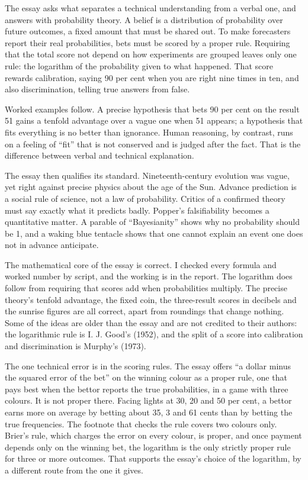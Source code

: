 \begin{afterword}
\summaryhead

The essay asks what separates a technical understanding from a verbal one, and answers with probability theory. A belief is a distribution of probability over future outcomes, a fixed amount that must be shared out. To make forecasters report their real probabilities, bets must be scored by a proper rule. Requiring that the total score not depend on how experiments are grouped leaves only one rule: the logarithm of the probability given to what happened. That score rewards calibration, saying 90 per cent when you are right nine times in ten, and also discrimination, telling true answers from false.

Worked examples follow. A precise hypothesis that bets 90 per cent on the result 51 gains a tenfold advantage over a vague one when 51 appears; a hypothesis that fits everything is no better than ignorance. Human reasoning, by contrast, runs on a feeling of ``fit'' that is not conserved and is judged after the fact. That is the difference between verbal and technical explanation.

The essay then qualifies its standard. Nineteenth-century evolution was vague, yet right against precise physics about the age of the Sun. Advance prediction is a social rule of science, not a law of probability. Critics of a confirmed theory must say exactly what it predicts badly. Popper's falsifiability becomes a quantitative matter. A parable of ``Bayesianity'' shows why no probability should be 1, and a waking blue tentacle shows that one cannot explain an event one does not in advance anticipate.

\responsehead

The mathematical core of the essay is correct. I checked every formula and worked number by script, and the working is in the report. The logarithm does follow from requiring that scores add when probabilities multiply. The precise theory's tenfold advantage, the fixed coin, the three-result scores in decibels and the sunrise figures are all correct, apart from roundings that change nothing. Some of the ideas are older than the essay and are not credited to their authors: the logarithmic rule is I. J. Good's (1952), and the split of a score into calibration and discrimination is Murphy's (1973).

The one technical error is in the scoring rules. The essay offers ``a dollar minus the squared error of the bet'' on the winning colour as a proper rule, one that pays best when the bettor reports the true probabilities, in a game with three colours. It is not proper there. Facing lights at 30, 20 and 50 per cent, a bettor earns more on average by betting about 35, 3 and 61 cents than by betting the true frequencies. The footnote that checks the rule covers two colours only. Brier's rule, which charges the error on every colour, is proper, and once payment depends only on the winning bet, the logarithm is the only strictly proper rule for three or more outcomes. That supports the essay's choice of the logarithm, by a different route from the one it gives.


\end{afterword}
